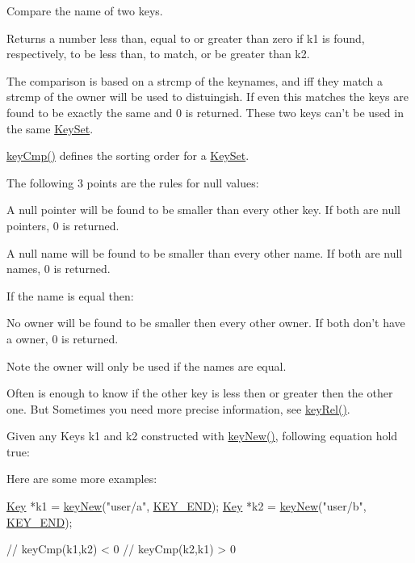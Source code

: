 Compare the name of two keys. 

\begin{DoxyReturn}{Returns}
a number less than, equal to or greater than zero if k1 is found, respectively, to be less than, to match, or be greater than k2.
\end{DoxyReturn}
The comparison is based on a strcmp of the keynames, and iff they match a strcmp of the owner will be used to distuingish. If even this matches the keys are found to be exactly the same and 0 is returned. These two keys can't be used in the same \hyperlink{classkdb_1_1KeySet}{Key\+Set}.

\hyperlink{group__keytest_gaf6e66e12fe04d535a5d1c8218ced803e}{key\+Cmp()} defines the sorting order for a \hyperlink{classkdb_1_1KeySet}{Key\+Set}.

The following 3 points are the rules for null values\+:


\begin{DoxyItemize}
\item A null pointer will be found to be smaller than every other key. If both are null pointers, 0 is returned.
\item A null name will be found to be smaller than every other name. If both are null names, 0 is returned.
\end{DoxyItemize}

If the name is equal then\+:


\begin{DoxyItemize}
\item No owner will be found to be smaller then every other owner. If both don't have a owner, 0 is returned.
\end{DoxyItemize}

\begin{DoxyNote}{Note}
the owner will only be used if the names are equal.
\end{DoxyNote}
Often is enough to know if the other key is less then or greater then the other one. But Sometimes you need more precise information, see \hyperlink{group__keytest_ga6bb0f95ac34ce9c42d61bb35a76139d0}{key\+Rel()}.

Given any Keys k1 and k2 constructed with \hyperlink{group__key_gad23c65b44bf48d773759e1f9a4d43b89}{key\+New()}, following equation hold true\+:


\begin{DoxyCodeInclude}
\end{DoxyCodeInclude}
 Here are some more examples\+: 
\begin{DoxyCode}
\hyperlink{classkdb_1_1Key_a5679f5cae63caddd64a60388b9cc77fa}{Key} *k1 = \hyperlink{group__key_gad23c65b44bf48d773759e1f9a4d43b89}{keyNew}(\textcolor{stringliteral}{"user/a"}, \hyperlink{group__key_gga91fb3178848bd682000958089abbaf40aa8adb6fcb92dec58fb19410eacfdd403}{KEY\_END});
\hyperlink{classkdb_1_1Key_a5679f5cae63caddd64a60388b9cc77fa}{Key} *k2 = \hyperlink{group__key_gad23c65b44bf48d773759e1f9a4d43b89}{keyNew}(\textcolor{stringliteral}{"user/b"}, \hyperlink{group__key_gga91fb3178848bd682000958089abbaf40aa8adb6fcb92dec58fb19410eacfdd403}{KEY\_END});

\textcolor{comment}{// keyCmp(k1,k2) < 0}
\textcolor{comment}{// keyCmp(k2,k1) > 0}
\end{DoxyCode}


